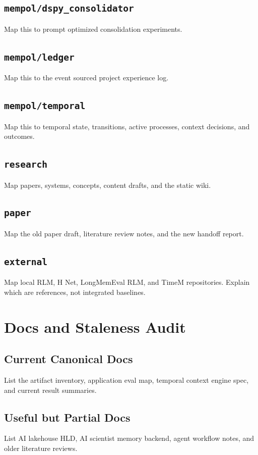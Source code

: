 \documentclass[11pt]{article}
\begin{document}
\subsection{\texttt{mempol/dspy\_consolidator}}
Map this to prompt optimized consolidation experiments.

\subsection{\texttt{mempol/ledger}}
Map this to the event sourced project experience log.

\subsection{\texttt{mempol/temporal}}
Map this to temporal state, transitions, active processes, context decisions, and outcomes.

\subsection{\texttt{research}}
Map papers, systems, concepts, content drafts, and the static wiki.

\subsection{\texttt{paper}}
Map the old paper draft, literature review notes, and the new handoff report.

\subsection{\texttt{external}}
Map local RLM, H Net, LongMemEval RLM, and TimeM repositories. Explain which are references, not integrated baselines.

\section{Docs and Staleness Audit}

\subsection{Current Canonical Docs}
List the artifact inventory, application eval map, temporal context engine spec, and current result summaries.

\subsection{Useful but Partial Docs}
List AI lakehouse HLD, AI scientist memory backend, agent workflow notes, and older literature reviews.
\end{document}
